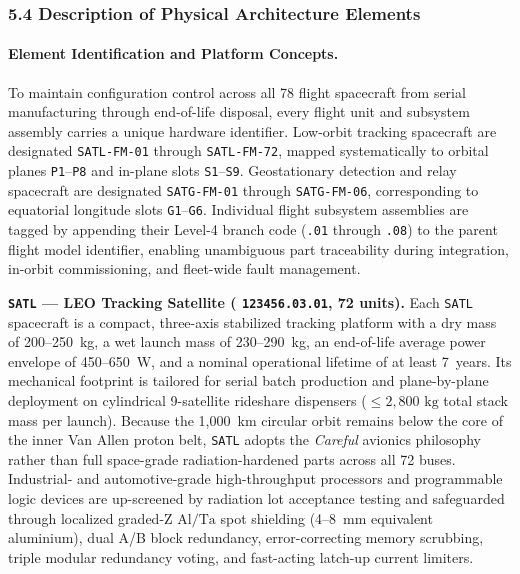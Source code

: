 \subsubsection{5.4 Description of Physical Architecture Elements}

\paragraph{Element Identification and Platform Concepts.}
To maintain configuration control across all 78 flight spacecraft from serial manufacturing through end-of-life disposal, every flight unit and subsystem assembly carries a unique hardware identifier. Low-orbit tracking spacecraft are designated \texttt{SATL-FM-01} through \texttt{SATL-FM-72}, mapped systematically to orbital planes \texttt{P1}--\texttt{P8} and in-plane slots \texttt{S1}--\texttt{S9}. Geostationary detection and relay spacecraft are designated \texttt{SATG-FM-01} through \texttt{SATG-FM-06}, corresponding to equatorial longitude slots \texttt{G1}--\texttt{G6}. Individual flight subsystem assemblies are tagged by appending their Level-4  branch code (\texttt{.01} through \texttt{.08}) to the parent flight model identifier, enabling unambiguous part traceability during integration, in-orbit commissioning, and fleet-wide fault management.

\textbf{\texttt{SATL} --- LEO Tracking Satellite ( \texttt{123456.03.01}, 72 units).}
Each \texttt{SATL} spacecraft is a compact, three-axis stabilized tracking platform with a dry mass of 200--250~kg, a wet launch mass of 230--290~kg, an end-of-life average power envelope of 450--650~W, and a nominal operational lifetime of at least 7~years. Its mechanical footprint is tailored for serial batch production and plane-by-plane deployment on cylindrical 9-satellite rideshare dispensers ($\le 2{,}800\text{ kg}$ total stack mass per launch). Because the 1,000~km circular orbit remains below the core of the inner Van Allen proton belt, \texttt{SATL} adopts the \emph{Careful } avionics philosophy rather than full space-grade radiation-hardened parts across all 72 buses. Industrial- and automotive-grade high-throughput processors and programmable logic devices are up-screened by radiation lot acceptance testing and safeguarded through localized graded-Z $\mathrm{Al}/\mathrm{Ta}$ spot shielding (4--8~mm equivalent aluminium), dual A/B block redundancy, error-correcting memory scrubbing, triple modular redundancy voting, and fast-acting latch-up current limiters.

